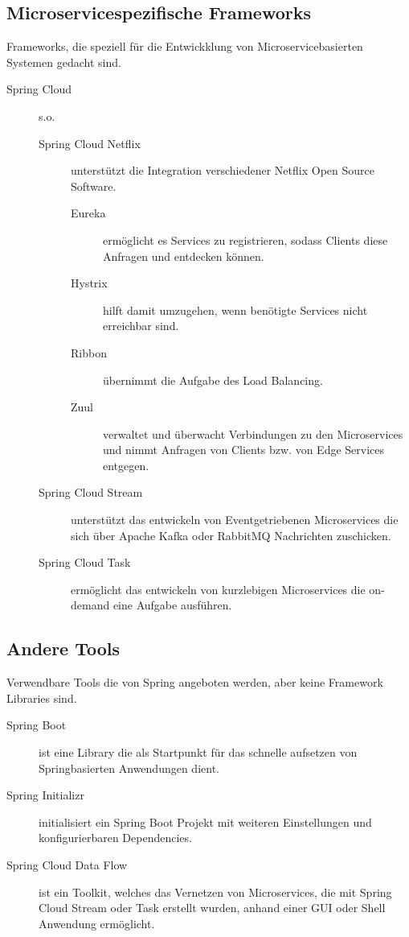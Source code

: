 \documentclass{article}
\begin{document}
\subsection{Microservicespezifische Frameworks}

Frameworks, die speziell für die Entwickklung von Microservicebasierten Systemen gedacht sind.

\begin{description}
    \item[Spring Cloud] s.o.
    \begin{description}
        \item[Spring Cloud Netflix] unterstützt die Integration verschiedener Netflix Open Source Software.
        \begin{description}
            \item[Eureka] ermöglicht es Services zu registrieren, sodass Clients diese Anfragen und entdecken können.
            \item[Hystrix] hilft damit umzugehen, wenn benötigte Services nicht erreichbar sind.
            \item[Ribbon] übernimmt die Aufgabe des Load Balancing.
            \item[Zuul] verwaltet und überwacht Verbindungen zu den Microservices und nimmt Anfragen von Clients bzw. von Edge Services entgegen.
        \end{description}

        \item[Spring Cloud Stream] unterstützt das entwickeln von Eventgetriebenen Microservices die sich über Apache Kafka oder RabbitMQ Nachrichten zuschicken.
        \item[Spring Cloud Task] ermöglicht das entwickeln von kurzlebigen Microservices die on-demand eine Aufgabe ausführen.
    \end{description}
\end{description}

\subsection{Andere Tools}

Verwendbare Tools die von Spring angeboten werden, aber keine Framework Libraries sind.

\begin{description}
    \item[Spring Boot] ist eine Library die als Startpunkt für das schnelle aufsetzen von Springbasierten Anwendungen dient.
    \item[Spring Initializr] initialisiert ein Spring Boot Projekt mit weiteren Einstellungen und konfigurierbaren Dependencies.
    \item[Spring Cloud Data Flow] ist ein Toolkit, welches das Vernetzen von Microservices, die mit Spring Cloud Stream oder Task erstellt wurden, anhand einer GUI oder Shell Anwendung ermöglicht.
\end{description}
\end{document}
